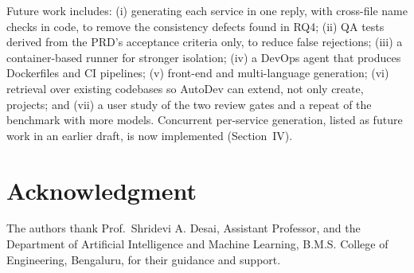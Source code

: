 \documentclass[conference,letterpaper]{IEEEtran}
\begin{document}
Future work includes: (i) generating each service in one reply, with
cross-file name checks in code, to remove the consistency defects found in RQ4;
(ii) QA tests derived from the PRD's acceptance criteria only, to reduce false
rejections; (iii) a container-based runner for stronger isolation; (iv) a DevOps
agent that produces Dockerfiles and CI pipelines; (v) front-end and
multi-language generation; (vi) retrieval over existing codebases so AutoDev can
extend, not only create, projects; and (vii) a user study of the two review
gates and a repeat of the benchmark with more models. Concurrent per-service
generation, listed as future work in an earlier draft, is now implemented
(Section~IV).

\section*{Acknowledgment}
The authors thank Prof.\ Shridevi A. Desai, Assistant Professor, and the Department of
Artificial Intelligence and Machine Learning, B.M.S. College of Engineering,
Bengaluru, for their guidance and support.
\end{document}
